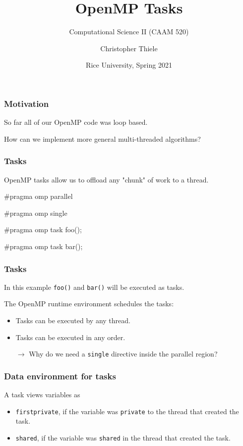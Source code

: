 \documentclass[12pt,t]{beamer}
\newcommand{\conclude}[1]{%
  \begin{itemize}
    \item[$\rightarrow$]#1
  \end{itemize}
}
\begin{document}
  \title{OpenMP Tasks}
  \subtitle{Computational Science II (CAAM 520)}
  \author{Christopher Thiele}
  \date{Rice University, Spring 2021}

  \begin{frame}
    \titlepage
  \end{frame}


  \begin{frame}[fragile]
    \frametitle{Motivation}

    So far all of our OpenMP code was loop based.

    How can we implement more general multi-threaded algorithms?
  \end{frame}

  \begin{frame}[fragile]
    \frametitle{Tasks}

    OpenMP tasks allow us to offload any "chunk" of work to a thread.
    \begin{code}
#pragma omp parallel
{
  #pragma omp single
  {
    #pragma omp task
    foo();

    #pragma omp task
    bar();
  }
}
    \end{code}
  \end{frame}

  \begin{frame}[fragile]
    \frametitle{Tasks}

    In this example \texttt{foo()} and \texttt{bar()} will be executed as tasks.

    The OpenMP runtime environment schedules the tasks:
    \begin{itemize}
      \item Tasks can be executed by any thread.
      \item Tasks can be executed in any order.
    \end{itemize}
    \conclude{Why do we need a \texttt{single} directive inside the parallel region?}
  \end{frame}

  \begin{frame}[fragile]
    \frametitle{Data environment for tasks}

    A task views variables as
    \begin{itemize}
      \item \texttt{firstprivate}, if the variable was \texttt{private} to the thread that created the task.
      \item \texttt{shared}, if the variable was \texttt{shared} in the thread that created the task.
    \end{itemize}
  \end{frame}
\end{document}

